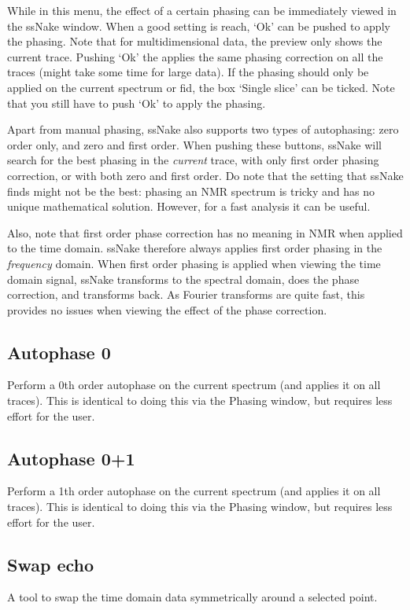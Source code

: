 \documentclass[11pt,a4paper]{article}
\begin{document}
While in this menu, the effect of a certain phasing can be immediately viewed in the ssNake window. When a
good setting is reach, `Ok' can be pushed to apply the phasing. Note that for multidimensional data, the
preview only shows the current trace. Pushing `Ok' the applies the same phasing correction on all the traces
(might take some time for large data). If the phasing should only be applied on the current spectrum or fid,
the box `Single slice' can be ticked. Note that you still have to push `Ok' to apply the phasing.

Apart from manual phasing, ssNake also supports two types of autophasing: zero order only, and zero and first
order. When pushing these buttons, ssNake will search for the best phasing in the \textit{current} trace, with
only first order phasing correction, or with both zero and first order. Do note that the setting that ssNake
finds might not be the best: phasing an NMR spectrum is tricky and has no unique mathematical solution.
However, for a fast analysis it can be useful.

Also, note that first order phase correction has no meaning in NMR when applied to the time domain. ssNake
therefore always applies first order phasing in the \textit{frequency} domain. When first order phasing is
applied when viewing the time domain signal, ssNake transforms to the spectral domain, does the phase
correction, and transforms back. As Fourier transforms are quite fast, this provides no issues when viewing
the effect of the phase correction.

\subsection{Autophase 0}
Perform a 0th order autophase on the current spectrum (and applies it on all traces). This is identical to doing this via the Phasing window, but requires less effort for the user.

\subsection{Autophase 0+1}
Perform a 1th order autophase on the current spectrum (and applies it on all traces). This is identical to doing this via the Phasing window, but requires less effort for the user.


\subsection{Swap echo}
A tool to swap the time domain data symmetrically around a selected point.
\end{document}
